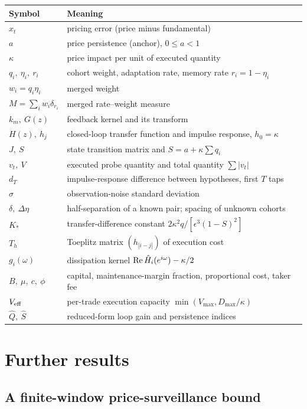 \documentclass[12pt]{article}
\theoremstyle{definition}
\theoremstyle{remark}
\begin{document}
\begin{longtable}{p{}p{}}
\toprule
Symbol & Meaning\\
\midrule
\endhead
$x_t$ & pricing error (price minus fundamental)\\
$a$ & price persistence (anchor), $0\le a<1$\\
$\kappa$ & price impact per unit of executed quantity\\
$q_i,\ \eta_i,\ r_i$ & cohort weight, adaptation rate, memory rate $r_i=1-\eta_i$\\
$w_i=q_i\eta_i$ & merged weight\\
$M=\sum_iw_i\delta_{r_i}$ & merged rate--weight measure\\
$k_m,\ G(z)$ & feedback kernel and its transform\\
$H(z),\ h_j$ & closed-loop transfer function and impulse response, $h_0=\kappa$\\
$J,\ S$ & state transition matrix and $S=a+\kappa\sum q_i$\\
$v_t,\ V$ & executed probe quantity and total quantity $\sum|v_t|$\\
$d_T$ & impulse-response difference between hypotheses, first $T$ taps\\
$\sigma$ & observation-noise standard deviation\\
$\delta,\ \Delta\eta$ & half-separation of a known pair; spacing of unknown cohorts\\
$K_*$ & transfer-difference constant $2\kappa^2q/[\epsilon^3(1-S)^2]$\\
$T_h$ & Toeplitz matrix $(h_{|i-j|})$ of execution cost\\
$g_i(\omega)$ & dissipation kernel ${\rm Re}\,\hat H_i(e^{i\omega})-\kappa/2$\\
$B,\ \mu,\ c,\ \phi$ & capital, maintenance-margin fraction, proportional cost, taker fee\\
$V_{\rm eff}$ & per-trade execution capacity $\min(V_{\max},D_{\max}/\kappa)$\\
$\hat Q,\ \hat S$ & reduced-form loop gain and persistence indices\\
\bottomrule
\end{longtable}

\section{Further results}\label{app:ia}

\subsection{A finite-window price-surveillance bound}
\end{document}

